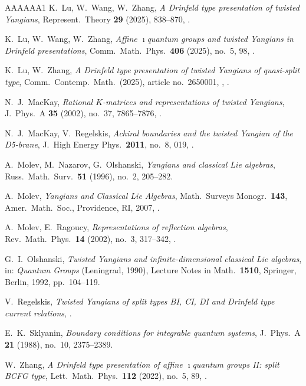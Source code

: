 \documentclass{amsart}
\numberwithin{equation}{section}
\theoremstyle{remark}
\renewcommand{\,}{\kern 0.1em} %
\begin{document}
\begin{thebibliography}{AAAAAA1}
	K.~Lu, W.~Wang, W.~Zhang,
	{\it A Drinfeld type presentation of twisted Yangians},
	Represent.~Theory {\bf 29} (2025), 838--870,
	.

	K.~Lu, W.~Wang, W.~Zhang,
	{\it Affine $\imath$quantum groups and twisted Yangians in Drinfeld presentations},
	Comm.~Math.~Phys.~{\bf 406} (2025), no.~5, 98,
	.

	K.~Lu, W.~Zhang,
	{\it A Drinfeld type presentation of twisted Yangians of quasi-split type},
	Comm.~Contemp.~Math.~(2025), article no.~2650001,
	,
	.

	N.~J.~MacKay,
	{\it Rational $K$-matrices and representations of twisted Yangians},
	J.~Phys.~A {\bf 35} (2002), no.~37, 7865--7876,
	.

	N.~J.~MacKay, V.~Regelskis,
	{\it Achiral boundaries and the twisted Yangian of the D5-brane},
	J.~High Energy Phys.~{\bf 2011}, no.~8, 019,
	.

	A.~Molev, M.~Nazarov, G.~Olshanski,
	{\it Yangians and classical Lie algebras},
	Russ.~Math.~Surv.~{\bf 51} (1996), no.~2, 205--282.

	A.~Molev,
	{\it Yangians and Classical Lie Algebras},
	Math.~Surveys Monogr.~{\bf 143}, Amer.~Math.~Soc., Providence, RI, 2007,
	.

	A.~Molev, E.~Ragoucy,
	{\it Representations of reflection algebras},
	Rev.~Math.~Phys.~{\bf 14} (2002), no.~3, 317--342,
	.

	G.~I.~Olshanski,
	{\it Twisted Yangians and infinite-dimensional classical Lie algebras},
	in: {\it Quantum Groups} (Leningrad, 1990), Lecture Notes in Math.~{\bf 1510}, Springer, Berlin, 1992, pp.~104--119.

	V.~Regelskis,
	{\it Twisted Yangians of split types BI, CI, DI and Drinfeld type current relations},
	.

	E.~K.~Sklyanin,
	{\it Boundary conditions for integrable quantum systems},
	J.~Phys.~A {\bf 21} (1988), no.~10, 2375--2389.

	W.~Zhang,
	{\it A Drinfeld type presentation of affine $\imath$quantum groups II: split BCFG type},
	Lett.~Math.~Phys.~{\bf 112} (2022), no.~5, 89,
	.

\end{thebibliography}


\end{document}
